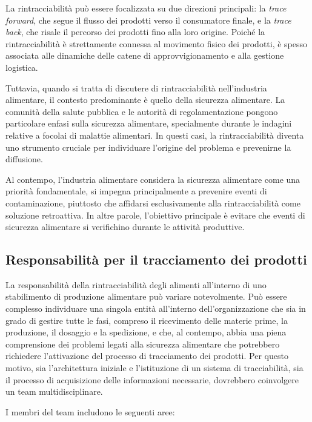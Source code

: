La rintracciabilità può essere focalizzata su due direzioni principali: la \textit{trace forward}, che segue il flusso dei prodotti verso il consumatore finale, e la \textit{trace back}, che risale il percorso dei prodotti fino alla loro origine. Poiché la rintracciabilità è strettamente connessa al movimento fisico dei prodotti, è spesso associata alle dinamiche delle catene di approvvigionamento e alla gestione logistica.

Tuttavia, quando si tratta di discutere di rintracciabilità nell'industria alimentare, il contesto predominante è quello della sicurezza alimentare. La comunità della salute pubblica e le autorità di regolamentazione pongono particolare enfasi sulla sicurezza alimentare, specialmente durante le indagini relative a focolai di malattie alimentari. In questi casi, la rintracciabilità diventa uno strumento cruciale per individuare l'origine del problema e prevenirne la diffusione.

Al contempo, l'industria alimentare considera la sicurezza alimentare come una priorità fondamentale, si impegna principalmente a prevenire eventi di contaminazione, piuttosto che affidarsi esclusivamente alla rintracciabilità come soluzione retroattiva. In altre parole, l'obiettivo principale è evitare che eventi di sicurezza alimentare si verifichino durante le attività produttive.

\subsection{Responsabilità per il tracciamento dei prodotti}

La responsabilità della rintracciabilità degli alimenti all'interno di uno stabilimento di produzione alimentare può variare notevolmente. Può essere complesso individuare una singola entità all'interno dell'organizzazione che sia in grado di gestire tutte le fasi, compreso il ricevimento delle materie prime, la produzione, il dosaggio e la spedizione, e che, al contempo, abbia una piena comprensione dei problemi legati alla sicurezza alimentare che potrebbero richiedere l'attivazione del processo di tracciamento dei prodotti. Per questo motivo, sia l'architettura iniziale e l'istituzione di un sistema di tracciabilità, sia il processo di acquisizione delle informazioni necessarie, dovrebbero coinvolgere un team multidisciplinare.

I membri del team includono le seguenti aree:

